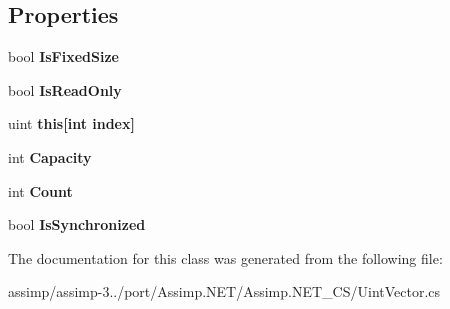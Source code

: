 \subsection*{Properties}
\begin{DoxyCompactItemize}
\item 
\hypertarget{class_uint_vector_afa838623335572174a3500ad259354a9}{bool {\bfseries Is\+Fixed\+Size}}\label{class_uint_vector_afa838623335572174a3500ad259354a9}

\item 
\hypertarget{class_uint_vector_a86d3af646bd2122a01d3211a142b8cec}{bool {\bfseries Is\+Read\+Only}}\label{class_uint_vector_a86d3af646bd2122a01d3211a142b8cec}

\item 
\hypertarget{class_uint_vector_a7dc43f144a61da3aa0c40154f3163f8e}{uint {\bfseries this\mbox{[}int index\mbox{]}}}\label{class_uint_vector_a7dc43f144a61da3aa0c40154f3163f8e}

\item 
\hypertarget{class_uint_vector_a27413df011cfddb825ce70f349292313}{int {\bfseries Capacity}}\label{class_uint_vector_a27413df011cfddb825ce70f349292313}

\item 
\hypertarget{class_uint_vector_a4801ce16a80200fc429767ee6931552e}{int {\bfseries Count}}\label{class_uint_vector_a4801ce16a80200fc429767ee6931552e}

\item 
\hypertarget{class_uint_vector_afb51133ed6259b680bb5f45935579ef4}{bool {\bfseries Is\+Synchronized}}\label{class_uint_vector_afb51133ed6259b680bb5f45935579ef4}

\end{DoxyCompactItemize}


The documentation for this class was generated from the following file\+:\begin{DoxyCompactItemize}
\item 
assimp/assimp-\/3../port/\+Assimp.\+N\+E\+T/\+Assimp.\+N\+E\+T\+\_\+\+C\+S/Uint\+Vector.\+cs\end{DoxyCompactItemize}
